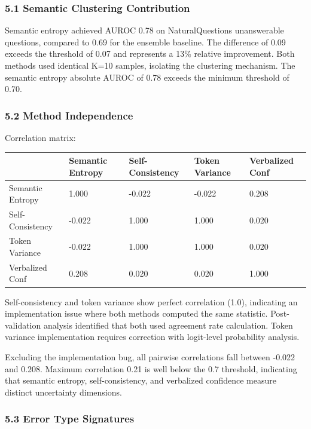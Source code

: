 
\subsubsection{5.1 Semantic Clustering Contribution}

Semantic entropy achieved AUROC 0.78 on NaturalQuestions unanswerable questions, compared to 0.69 for the ensemble baseline. The difference of 0.09 exceeds the threshold of 0.07 and represents a 13\% relative improvement. Both methods used identical K=10 samples, isolating the clustering mechanism. The semantic entropy absolute AUROC of 0.78 exceeds the minimum threshold of 0.70.

\subsubsection{5.2 Method Independence}

Correlation matrix:

\begin{table}[htbp]
\centering
\begin{tabular}{lllll}
\toprule
 & Semantic Entropy & Self-Consistency & Token Variance & Verbalized Conf \\
\midrule
Semantic Entropy & 1.000 & -0.022 & -0.022 & 0.208 \\
Self-Consistency & -0.022 & 1.000 & 1.000 & 0.020 \\
Token Variance & -0.022 & 1.000 & 1.000 & 0.020 \\
Verbalized Conf & 0.208 & 0.020 & 0.020 & 1.000 \\
\bottomrule
\end{tabular}
\end{table}

Self-consistency and token variance show perfect correlation (1.0), indicating an implementation issue where both methods computed the same statistic. Post-validation analysis identified that both used agreement rate calculation. Token variance implementation requires correction with logit-level probability analysis.

Excluding the implementation bug, all pairwise correlations fall between -0.022 and 0.208. Maximum correlation 0.21 is well below the 0.7 threshold, indicating that semantic entropy, self-consistency, and verbalized confidence measure distinct uncertainty dimensions.

\subsubsection{5.3 Error Type Signatures}

